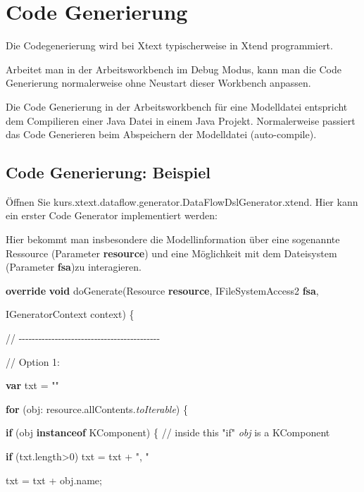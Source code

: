 \documentclass[]{article}
\begin{document}
\section[Code
Generierung]{\texorpdfstring{\protect\hypertarget{anchor-33}{}{}\protect\hypertarget{anchor-34}{}{}Code
Generierung}{Code Generierung}}\label{code-generierung}

Die Codegenerierung wird bei Xtext typischerweise in Xtend programmiert.

Arbeitet man in der Arbeitsworkbench im Debug Modus, kann man die Code
Generierung normalerweise ohne Neustart dieser Workbench anpassen.

Die Code Generierung in der Arbeitsworkbench für eine Modelldatei
entspricht dem Compilieren einer Java Datei in einem Java Projekt.
Normalerweise passiert das Code Generieren beim Abspeichern der
Modelldatei (auto-compile).

\subsection[Code Generierung:
Beispiel]{\texorpdfstring{\protect\hypertarget{anchor-35}{}{}Code
Generierung:
Beispiel}{Code Generierung: Beispiel}}\label{code-generierung-beispiel}

Öffnen Sie kurs.xtext.dataflow.generator.DataFlowDslGenerator.xtend.
Hier kann ein erster Code Generator implementiert werden:

Hier bekommt man insbesondere die Modellinformation über eine sogenannte
Ressource (Parameter \textbf{resource}) und eine Möglichkeit mit dem
Dateisystem (Parameter \textbf{fsa})zu interagieren.

\textbf{override} \textbf{void} doGenerate(Resource \textbf{resource},
IFileSystemAccess2 \textbf{fsa},

IGeneratorContext context) \{

//
-\/-\/-\/-\/-\/-\/-\/-\/-\/-\/-\/-\/-\/-\/-\/-\/-\/-\/-\/-\/-\/-\/-\/-\/-\/-\/-\/-\/-\/-\/-\/-\/-\/-\/-\/-\/-\/-\/-\/-\/-\/-\/-

// Option 1:

\textbf{var} txt = ""

\textbf{for} (obj: resource.allContents.\emph{toIterable}) \{

\textbf{if} (obj \textbf{instanceof} KComponent) \{ // inside this "if"
\emph{obj} is a KComponent

\textbf{if} (txt.length\textgreater{}0) txt = txt + ", "

txt = txt + obj.name;
\end{document}
